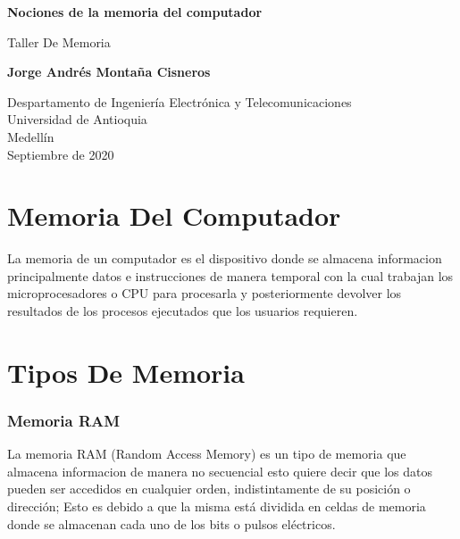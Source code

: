 \documentclass{article}
\begin{document}
\begin{titlepage}
    \begin{center}
        \vspace*{1cm}
            
        \Huge
        \textbf{Nociones de la memoria del
computador}
            
        \vspace{0.5cm}
        \LARGE
        Taller De Memoria
            
        \vspace{1.5cm}
            
        \textbf{Jorge Andrés Montaña Cisneros}
            
        \vfill
            
        \vspace{0.8cm}
            
        \Large
        Despartamento de Ingeniería Electrónica y Telecomunicaciones\\
        Universidad de Antioquia\\
        Medellín\\
        Septiembre de 2020
            
    \end{center}
\end{titlepage}

\tableofcontents

\newpage

\section{Memoria Del Computador}
La memoria de un computador  es el dispositivo donde se almacena informacion principalmente datos e instrucciones de manera temporal  con la cual trabajan los microprocesadores o CPU para procesarla y posteriormente devolver los resultados de los procesos ejecutados que los usuarios requieren.

\section{Tipos De Memoria} \label{contenido}

\subsubsection{Memoria RAM}
La memoria RAM (Random Access Memory) es un tipo de memoria que almacena informacion de manera no secuencial esto quiere decir que los datos pueden ser accedidos en cualquier orden, indistintamente de su posición o dirección; Esto es debido a que la misma está dividida en celdas de memoria donde se almacenan cada uno de los bits o pulsos eléctricos.
\end{document}
